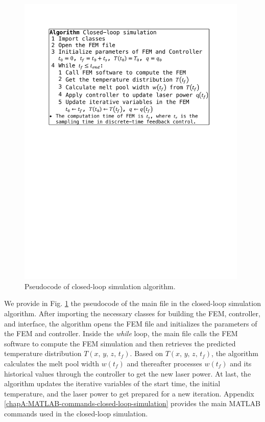 \documentclass [11pt, proquest] {uwthesis}[2020/02/24]
\begin{document}
\begin{figure}[!ht]
\begin{centering}
\includegraphics[clip,width=11cm]{Closed-loop-simulation/pseudocode_math}
\par\end{centering}
\centering{}\caption{\label{fig:Pseudocode-for-the}Pseudocode of closed-loop simulation
algorithm.}
\end{figure}
We provide in Fig. \ref{fig:Pseudocode-for-the} the pseudocode of
the main file in the closed-loop simulation algorithm. After importing
the necessary classes for building the FEM, controller, and interface,
the algorithm opens the FEM file and initializes the parameters of
the FEM and controller. Inside the \emph{while} loop, the main file
calls the FEM software to compute the FEM simulation and then retrieves
the predicted temperature distribution $T(x,\,y,\,z,\,t_{f})$. Based
on $T(x,\,y,\,z,\,t_{f})$, the algorithm calculates the melt pool
width $w(t_{f})$ and thereafter processes $w(t_{f})$ and its historical
values through the controller to get the new laser power. At last,
the algorithm updates the iterative variables of the start time, the
initial temperature, and the laser power to get prepared for a new
iteration. Appendix \ref{chapA:MATLAB-commands-closed-loop-simulation} provides the main MATLAB commands used in
the closed-loop simulation.
\end{document}
